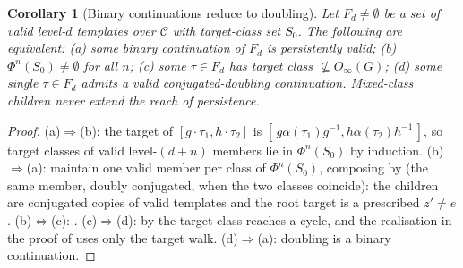 \documentclass[11pt]{amsart}
\newtheorem{corollary}[corollary]{Corollary}
\theoremstyle{definition}
\theoremstyle{remark}
\theoremstyle{plain}
\theoremstyle{plain}
\numberwithin{equation}{section}
\begin{document}
\begin{corollary}[Binary continuations reduce to doubling]
\label{cor:binaryred}
Let $F_d\neq\emptyset$ be a set of valid level-$d$ templates over $\mathcal{C}$ with
target-class set $S_0$. The
following are equivalent: \textup{(a)} some binary continuation of $F_d$ is persistently valid;
\textup{(b)} $\Phi^n(S_0)\neq\emptyset$ for all $n$; \textup{(c)} some $\tau\in F_d$ has target
class $\not\subseteq O_\infty(G)$; \textup{(d)} some single $\tau\in F_d$ admits a valid
conjugated-doubling continuation. Mixed-class children never extend the reach of persistence.
\end{corollary}
\begin{proof}
(a)$\Rightarrow$(b): the target of $[g\cdot\tau_1,h\cdot\tau_2]$ is
$[\,g\alpha(\tau_1)g^{-1},h\alpha(\tau_2)h^{-1}\,]$, so target classes of valid level-$(d+n)$
members lie in $\Phi^n(S_0)$ by induction. (b)$\Rightarrow$(a): maintain one valid member per
class of $\Phi^n(S_0)$, composing by  (the same member, doubly
conjugated, when the two classes coincide): the children are conjugated copies of valid
templates and the root target is a prescribed $z'\neq e$. (b)$\Leftrightarrow$(c):
. (c)$\Rightarrow$(d): by  the target class reaches a
cycle, and the realisation in the proof of  uses only the target walk.
(d)$\Rightarrow$(a): doubling is a binary continuation.
\end{proof}
\end{document}

